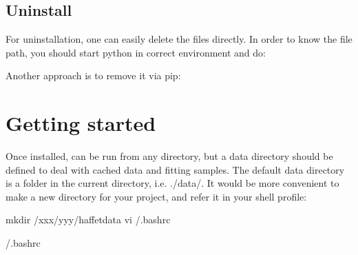\documentclass[letterpaper,10pt,english]{sphinxmanual}
\begin{document}
\begin{sphinxVerbatim}[commandchars=\\\{\}]
   
\end{sphinxVerbatim}


\subsection{Uninstall}
\label{\detokenize{install:uninstall}}
For uninstallation, one can easily delete the files directly.
In order to know the file path, you should start python in correct environment and do:

\begin{sphinxVerbatim}[commandchars=\\\{\}]
 
\end{sphinxVerbatim}

Another approach is to remove it via pip:

\begin{sphinxVerbatim}[commandchars=\\\{\}]
  
\end{sphinxVerbatim}


\section{Getting started}
\label{\detokenize{tutorial:getting-started}}\label{\detokenize{tutorial:getstart}}\label{\detokenize{tutorial::doc}}
Once installed,  can be run from any directory, but a data directory should be defined to deal with cached data and fitting samples. The default data directory is a folder in the current directory, i.e. ./data/. It would be more convenient to make a new directory for your project, and refer it in your shell profile:

\begin{sphinxVerbatim}[commandchars=\\\{\}]
\PYGZgt{}\PYGZgt{}\PYGZgt{} mkdir /xxx/yyy/haffet\PYGZus{}data
\PYGZgt{}\PYGZgt{}\PYGZgt{} vi \PYGZti{}/.bashrc

\PYGZgt{}\PYGZgt{}\PYGZgt{}  
\PYGZgt{}\PYGZgt{}\PYGZgt{}  \PYGZti{}/.bashrc
\end{sphinxVerbatim}
\end{document}
